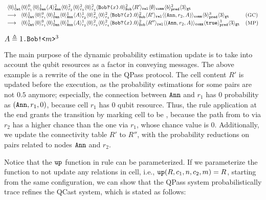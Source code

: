 {\footnotesize
\begin{center}
\[
\begin{array}{ll}
\langle 0 \rangle^{1}_{\texttt{Cat}}
\langle 0 \rangle^{0}_{r_1}
\langle 0 \rangle^{1}_{\texttt{Dan}}
\langle A \rangle^{2}_{\texttt{Ann}}
\langle 0 \rangle^{2}_{r_2}
\langle 0 \rangle^{2}_{r_3}
\langle 0 \rangle^{2}_{r_4}
\langle \texttt{Bob}\texttt{?(}x\texttt{)}.0 \rangle^{2}_{\texttt{Bob}}
\langle R' \rangle_{\texttt{rel}}
\langle \emptyset \rangle_{\texttt{comm}}
\langle b \rangle^{2}_{\texttt{pred}}
\langle 3 \rangle_{\texttt{gt}}
\\[0.2em]
\longrightarrow
\;\;
\langle 0 \rangle^{1}_{\texttt{Cat}}
\langle 0 \rangle^{0}_{r_1}
\langle 0 \rangle^{1}_{\texttt{Dan}}
\langle 0 \rangle^{1}_{\texttt{Ann}}
\langle A \rangle^{1}_{r_2}
\langle 0 \rangle^{2}_{r_3}
\langle 0 \rangle^{2}_{r_4}
\langle \texttt{Bob}\texttt{?(}x\texttt{)}.0 \rangle^{2}_{\texttt{Bob}}
\langle R' \rangle_{\texttt{rel}}
\langle (\texttt{Ann},r_2,A) \rangle_{\texttt{comm}}
\langle b \rangle^{3}_{\texttt{pred}}
\langle 3 \rangle_{\texttt{gt}}
&
({\small \textsc{GC}})
\\[0.2em]
\longrightarrow
\;\;
\langle 0 \rangle^{1}_{\texttt{Cat}}
\langle 0 \rangle^{0}_{r_1}
\langle 0 \rangle^{1}_{\texttt{Dan}}
\langle 0 \rangle^{1}_{\texttt{Ann}}
\langle A \rangle^{1}_{r_2}
\langle 0 \rangle^{2}_{r_3}
\langle 0 \rangle^{2}_{r_4}
\langle \texttt{Bob}\texttt{?(}x\texttt{)}.0 \rangle^{2}_{\texttt{Bob}}
\langle R'' \rangle_{\texttt{rel}}
\langle (\texttt{Ann},r_2,A) \rangle_{\texttt{comm}}
\langle \texttt{true} \rangle^{3}_{\texttt{pred}}
\langle 3 \rangle_{\texttt{gt}}
&
({\small \textsc{MP}})
\end{array}
\]
\end{center}
}
{\footnotesize
\begin{center}
$A\triangleq1\texttt{.}\texttt{Bob}\texttt{!<}m\texttt{>}^3$
\end{center}
}

The main purpose of the dynamic probability estimation update is to take into account the qubit resources as a factor in conveying messages. The above example is a rewrite of the one in the QPass protocol. The  cell content $R'$ is updated before the execution, as the probability estimations for some pairs are not $0.5$ anymore; especially, the connection between $\texttt{Ann}$ and $r_1$ has $0$ probability as $(\texttt{Ann},r_1,0)$, because cell $r_1$ has $0$ qubit resource. Thus, the  rule application at the end grants the transition by marking cell  to be , because the path from  to  via $r_2$ has a higher chance than the one via $r_1$, whose chance value is $0$. Additionally, we update the connectivity table $R'$ to $R''$, with the probability reductions on pairs related to nodes $\texttt{Ann}$ and $r_2$.

Notice that the $\texttt{up}$ function in rule  can be parameterized. If we parameterize the  function to not update any relations in  cell, i.e., $\texttt{up}(R,c_1,n,c_2,m)=R$, starting from the same configuration, we can show that the QPass system probabilistically trace refines the QCast system, which is stated as follows:

